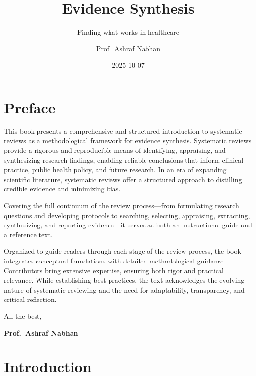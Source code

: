 \documentclass[
  11pt,
  a4paper,
  DIV=11,
  numbers=noendperiod]{scrreprt}
\title{Evidence Synthesis}
\subtitle{Finding what works in healthcare}
\author{Prof.~Ashraf Nabhan}
\date{2025-10-07}
\renewcommand*\contentsname{Table of contents}
\newcommand\contentsname{Table of contents}
\begin{document}
\maketitle

\renewcommand*\contentsname{On this page}
{
\hypersetup{linkcolor=}
\setcounter{tocdepth}{2}
\tableofcontents
}


\chapter*{Preface}\label{preface}


This book presents a comprehensive and structured introduction to
systematic reviews as a methodological framework for evidence synthesis.
Systematic reviews provide a rigorous and reproducible means of
identifying, appraising, and synthesizing research findings, enabling
reliable conclusions that inform clinical practice, public health
policy, and future research. In an era of expanding scientific
literature, systematic reviews offer a structured approach to distilling
credible evidence and minimizing bias.

Covering the full continuum of the review process---from formulating
research questions and developing protocols to searching, selecting,
appraising, extracting, synthesizing, and reporting evidence---it serves
as both an instructional guide and a reference text.

Organized to guide readers through each stage of the review process, the
book integrates conceptual foundations with detailed methodological
guidance. Contributors bring extensive expertise, ensuring both rigor
and practical relevance. While establishing best practices, the text
acknowledges the evolving nature of systematic reviewing and the need
for adaptability, transparency, and critical reflection.

All the best,

\textbf{Prof.~Ashraf Nabhan}


\chapter*{Introduction}\label{introduction}

\end{document}
